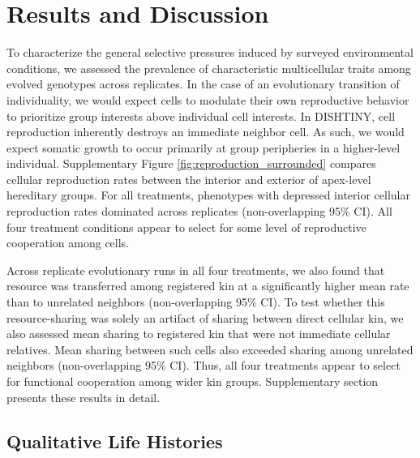 \section{Results and Discussion}

To characterize the general selective pressures induced by surveyed environmental conditions, we assessed the prevalence of characteristic multicellular traits among evolved genotypes across replicates.
In the case of an evolutionary transition of individuality, we would expect cells to modulate their own reproductive behavior to prioritize group interests above individual cell interests.
In DISHTINY, cell reproduction inherently destroys an immediate neighbor cell.
As such, we would expect somatic growth to occur primarily at group peripheries in a higher-level individual.
Supplementary Figure \ref{fig:reproduction_surrounded} compares cellular reproduction rates between the interior and exterior of apex-level hereditary groups.
For all treatments, phenotypes with depressed interior cellular reproduction rates dominated across replicates (non-overlapping 95\% CI).
All four treatment conditions appear to select for some level of reproductive cooperation among cells.

Across replicate evolutionary runs in all four treatments, we also found that resource was transferred among registered kin at a significantly higher mean rate than to unrelated neighbors (non-overlapping 95\% CI).
To test whether this resource-sharing was solely an artifact of sharing between direct cellular kin, we also assessed mean sharing to registered kin that were not immediate cellular relatives.
Mean sharing between such cells also exceeded sharing among unrelated neighbors (non-overlapping 95\% CI).
Thus, all four treatments appear to select for functional cooperation among wider kin groups.
Supplementary section \label{sec:resource-sharing} presents these results in detail.

\subsection{Qualitative Life Histories} \label{sec:life-histories}




